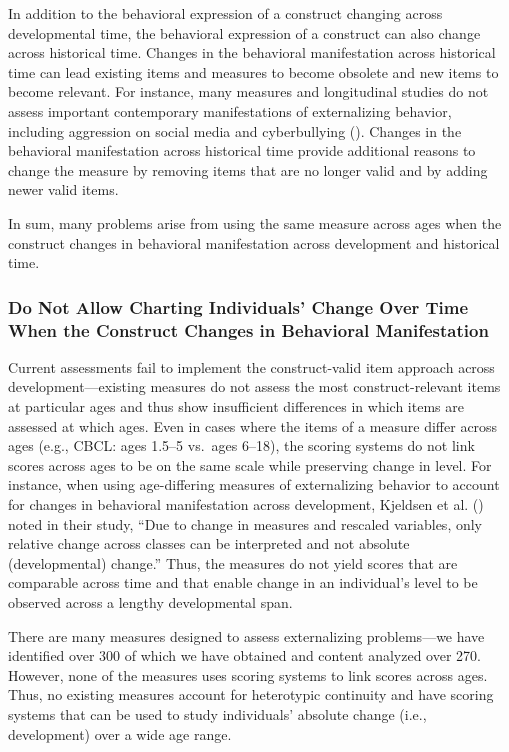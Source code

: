 \documentclass[
  american,
  letterpaper,
  12pt]{article}
\newcounter{none} %
\begin{document}
In addition to the behavioral expression of a construct changing across
developmental time, the behavioral expression of a construct can also
change across historical time. Changes in the behavioral manifestation
across historical time can lead existing items and measures to become
obsolete and new items to become relevant. For instance, many measures
and longitudinal studies do not assess important contemporary
manifestations of externalizing behavior, including aggression on social
media and cyberbullying (). Changes in the behavioral manifestation across
historical time provide additional reasons to change the measure by
removing items that are no longer valid and by adding newer valid items.

In sum, many problems arise from using the same measure across ages when
the construct changes in behavioral manifestation across development and
historical time.

\subsubsection{Do Not Allow Charting Individuals' Change Over Time When
the Construct Changes in Behavioral
Manifestation}\label{do-not-allow-charting-individuals-change-over-time-when-the-construct-changes-in-behavioral-manifestation}

Current assessments fail to implement the construct-valid item approach
across development---existing measures do not assess the most
construct-relevant items at particular ages and thus show insufficient
differences in which items are assessed at which ages. Even in cases
where the items of a measure differ across ages (e.g., CBCL: ages 1.5--5
vs.~ages 6--18), the scoring systems do not link scores across ages to
be on the same scale while preserving change in level. For instance,
when using age-differing measures of externalizing behavior to account
for changes in behavioral manifestation across development, Kjeldsen et
al. () noted in their study,
``Due to change in measures and rescaled variables, only relative change
across classes can be interpreted and not absolute (developmental)
change.'' Thus, the measures do not yield scores that are comparable
across time and that enable change in an individual's level to be
observed across a lengthy developmental span.

There are many measures designed to assess externalizing problems---we
have identified over 300 of which we have obtained and content analyzed
over 270. However, none of the measures uses scoring systems to link
scores across ages. Thus, no existing measures account for heterotypic
continuity and have scoring systems that can be used to study
individuals' absolute change (i.e., development) over a wide age range.
\end{document}
